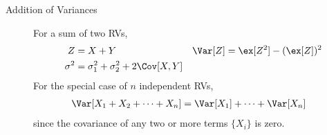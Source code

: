 \begin{description}
    \item[Addition of Variances] For a sum of two RVs,
          \begin{align}
              Z        & = X + Y                                &
              \Var[Z]  & = \ex[Z^2] - (\ex[Z])^2                  \\
              \sigma^2 & = \sigma_1^2 + \sigma_2^2 + 2\Cov[X,Y]
          \end{align}
          For the special case of $ n $ independent RVs,
          \begin{align}
              \Var[X_1 + X_2 + \dots + X_n] & = \Var[X_1] + \dots + \Var[X_n]
          \end{align}
          since the covariance of any two or more terms $ \{X_i\} $ is zero.
\end{description}